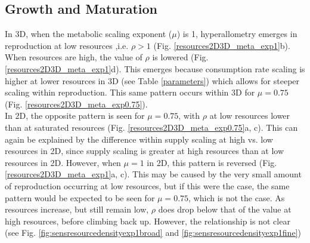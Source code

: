 \documentclass[a4paper, 11pt, hidelinks]{article} %
\begin{document}
	\subsection{Growth and Maturation}
	In 3D, when the metabolic scaling exponent ($ \mu $) is 1, hyperallometry emerges in reproduction at low resources ,i.e. $ \rho > 1 $ (Fig. \ref{resources2D3D_meta_exp1}b).  When resources are high, the value of $ \rho $ is lowered (Fig. \ref{resources2D3D_meta_exp1}d).  This emerges because consumption rate scaling is higher at lower resources in 3D (see Table \ref{parameters}) which allows for steeper scaling within reproduction.  This same pattern occurs within 3D for $ \mu = 0.75$ (Fig. \ref{resources2D3D_meta_exp0.75}).  
	\\
	In 2D, the opposite pattern is seen for $ \mu = 0.75 $, with $ \rho $ at low resources lower than at saturated resources (Fig. \ref{resources2D3D_meta_exp0.75}a, c).  This can again be explained by the difference within supply scaling at high vs. low resources in 2D, since supply scaling is greater at high resources than at low resources in 2D.  However, when $ \mu = 1 $ in 2D, this pattern is reversed (Fig. \ref{resources2D3D_meta_exp1}a, c).  This may be caused by the very small amount of reproduction occurring at low resources, but if this were the case, the same pattern would be expected to be seen for $ \mu = 0.75 $, which is not the case.  As resources increase, but still remain low, $ \rho $ does drop below that of the value at high resources, before climbing back up.  However, the relationship is not clear (see Fig. \ref{fig:sensresourcedensityexp1broad} and \ref{fig:sensresourcedensityexp1fine})
	
	
\end{document}
